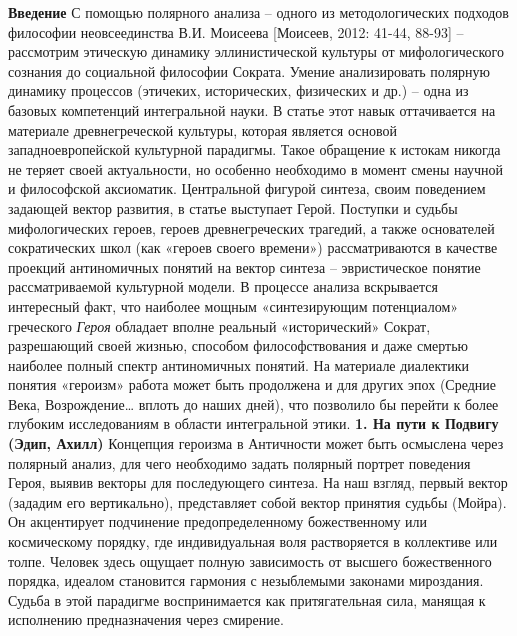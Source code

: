     \textbf{Введение}
    С помощью полярного анализа – одного из методологических подходов философии неовсеединства В.И. Моисеева [Моисеев, 2012: 41-44, 88-93] – рассмотрим этическую динамику эллинистической культуры от мифологического сознания до социальной философии Сократа. Умение анализировать полярную динамику процессов (этичеких, исторических, физических и др.) – одна из базовых компетенций интегральной науки. В статье этот навык оттачивается на материале древнегреческой культуры, которая является основой западноевропейской культурной парадигмы. Такое обращение к истокам никогда не теряет своей актуальности, но особенно необходимо в момент смены научной и философской аксиоматик. Центральной фигурой синтеза, своим поведением задающей вектор развития, в статье выступает Герой. Поступки и судьбы мифологических героев, героев древнегреческих трагедий, а также основателей сократических школ (как «героев своего времени») рассматриваются в качестве проекций антиномичных понятий на вектор синтеза – эвристическое понятие рассматриваемой культурной модели. В процессе анализа вскрывается интересный факт, что наиболее мощным «синтезирующим потенциалом» греческого \textit{Героя} обладает вполне реальный «исторический» Сократ, разрешающий своей жизнью, способом философствования и даже смертью наиболее полный спектр антиномичных понятий. На материале диалектики понятия «героизм» работа может быть продолжена и для других эпох (Средние Века, Возрождение… вплоть до наших дней), что позволило бы перейти к более глубоким исследованиям в области интегральной этики.
    \textbf{1. На пути к Подвигу (Эдип, Ахилл)}
    Концепция героизма в Античности может быть осмыслена через полярный анализ, для чего необходимо задать полярный портрет поведения Героя, выявив векторы для последующего синтеза. На наш взгляд, первый вектор (зададим его вертикально), представляет собой вектор принятия судьбы (Мойра). Он акцентирует подчинение предопределенному божественному или космическому порядку, где индивидуальная воля растворяется в коллективе или толпе. Человек здесь ощущает полную зависимость от высшего божественного порядка, идеалом становится гармония с незыблемыми законами мироздания. Судьба в этой парадигме воспринимается как притягательная сила, манящая к исполнению предназначения через смирение.
